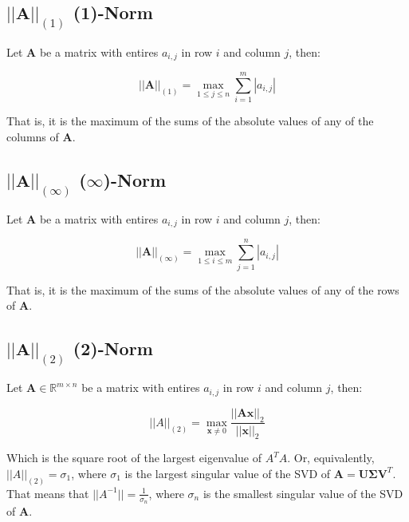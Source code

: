 \subsection{$||\mathbf{A}||_{(1)}$ (1)-Norm}
Let $\mathbf{A}$ be a matrix with entires $a_{i,j}$ in row $i$ and column $j$, then:

\begin{equation}
||\mathbf{A}||_{(1)} = \max_{1\leq j \leq n} \sum^m_{i=1} |a_{i,j} |
\end{equation}

That is, it is the maximum of the sums of the absolute values of any of the columns of $\mathbf{A}$.

\subsection{$||\mathbf{A}||_{(\infty)}$ ($\infty$)-Norm}

Let $\mathbf{A}$ be a matrix with entires $a_{i,j}$ in row $i$ and column $j$, then:

\begin{equation}
||\mathbf{A}||_{(\infty)} = \max_{1\leq i \leq m} \sum^n_{j=1} |a_{i,j} |
\end{equation}

That is, it is the maximum of the sums of the absolute values of any of the rows of $\mathbf{A}$.

\subsection{$||\mathbf{A}||_{(2)}$ (2)-Norm}
\label{sec:2norm}

Let $\mathbf{A} \in \mathbb{R}^{m\times n}$ be a matrix with entires $a_{i,j}$ in row $i$ and column $j$, then:

\begin{equation}
||A||_{(2)} = \max_{\mathbf{x}\neq 0} \frac{||\mathbf{Ax}||_2}{||\mathbf{x}||_2}
\end{equation}

Which is the square root of the largest eigenvalue of $A^T A$. Or, equivalently, $||A||_{(2)} = \sigma_1$, where $\sigma_1$ is the largest singular value of the SVD of $\mathbf{A} = \mathbf{U\Sigma V}^T$. That means that $||A^{-1}|| = \frac{1}{\sigma_n}$, where $\sigma_n$ is the smallest singular value of the SVD of $\mathbf{A}$.




